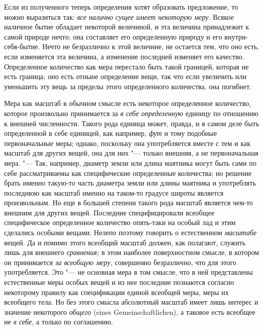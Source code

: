 Если из полученного теперь определения хотят образовать предложение, то
можно выразиться так: {\em все налично сущее имеет
некоторую меру}. Всякое наличное бытие обладает некоторой величиной, и эта
величина принадлежит к самой природе нечто; она составляет его определенную
природу и его внутри-себя-бытие. Нечто не безразлично к этой величине, не
остается тем, что оно есть, если изменяется эта величина, а изменение
последней изменяет его качество. Определенное количество как мера перестало
быть такой границей, которая не есть граница; оно есть отныне определение
вещи, так что если увеличить или уменьшить эту вещь за пределы этого
определенного количества, она погибнет.

Мера как масштаб в обычном смысле есть некоторое определенное количество,
которое произвольно принимается за {\em в себе
определенную} единицу по отношению к внешней численности. Такого рода
единица может, правда, и в самом деле быть определенной в себе единицей,
как например, {\em фут}
и тому подобные первоначальные меры; однако, поскольку она употребляется
вместе с тем и как масштаб для других вещей, она для них "--- только внешняя,
а не первоначальная мера. "--- Так, например, диаметр земли или длина маятника
могут быть сами по себе рассматриваемы как специфические определенные
количества; но решение брать именно такую-то часть диаметра земли или длины
маятника и употреблять последнюю как масштаб именно на таком-то градусе
широты является произвольным. Но еще в большей степени такого рода масштаб
является чем-то внешним для других вещей. Последние специфицировали
всеобщее специфическое определенное количество опять-таки на особый лад и
этим сделались особыми вещами. Нелепо поэтому говорить о естественном
{\em масштабе} вещей. Да и помимо этого всеобщий
масштаб должен, как полагают, служить лишь для внешнего
{\em сравнения;} в этом наиболее поверхностном смысле,
в котором он принимается {\em за всеобщую меру},
совершенно безразлично, что для этого употребляется. Это "--- не основная мера
в том смысле, что в ней представлены естественные меры особых вещей и из
нее последние познаются согласно некоторому правилу как спецификации единой
всеобщей меры, меры их всеобщего тела. Но без этого смысла абсолютный
масштаб имеет лишь интерес и значение некоторого
{\em общего} (eines Gemeinschaftlichen), а таковое есть
всеобщее не {\em в себе}, а только по соглашению.

